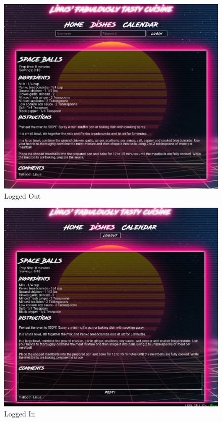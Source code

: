 \documentclass[a4paper]{scrartcl}
\begin{document}
\begin{figure}[H]
  \begin{center}
    \includegraphics[scale=0.32]{images/comments_logged_out.png}
    \caption{Logged Out}
    \label{fig:cmt_out}
  \end{center}
\end{figure}

\begin{figure}[H]
  \begin{center}
    \includegraphics[scale=0.32]{images/comments_logged_in.png}
    \caption{Logged In}
    \label{fig:cmt_in}
  \end{center}
\end{figure}
\end{document}
